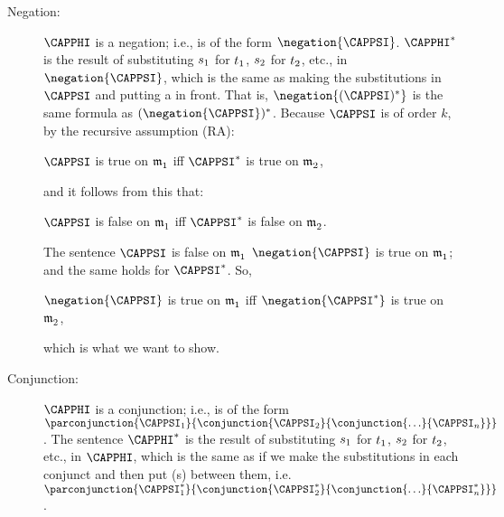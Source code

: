 \begin{PROOF}
\begin{description}
\begin{description}
\item[Negation:] $\CAPPHI$ is a negation; i.e., is of the form $\negation{\CAPPSI}$. 
 $\CAPPHI^*$ is the result of substituting $s_1$ for $t_1$, $s_2$ for $t_2$, etc., in $\negation{\CAPPSI}$, which is the same as making the substitutions in $\CAPPSI$ and putting a \mention{$\NEGATION$} in front. 
That is, $\negation{(\CAPPSI)^*}$ is the same formula as $(\negation{\CAPPSI})^*$. 
Because $\CAPPSI$ is of order $k$, by the recursive assumption (RA):
\begin{center}
$\CAPPSI$ is true on $\mathfrak{m^{\mathrm{}}_{\mathrm{1}}}$ iff $\CAPPSI^*$ is true on $\mathfrak{m^{\mathrm{}}_{\mathrm{2}}}$,
\end{center}
and it follows from this that:
\begin{center}
$\CAPPSI$ is false on $\mathfrak{m^{\mathrm{}}_{\mathrm{1}}}$ iff $\CAPPSI^*$ is false on $\mathfrak{m^{\mathrm{}}_{\mathrm{2}}}$.
\end{center}
The sentence $\CAPPSI$ is false on $\mathfrak{m^{\mathrm{}}_{\mathrm{1}}}$ \Iff $\negation{\CAPPSI}$ is true on $\mathfrak{m^{\mathrm{}}_{\mathrm{1}}}$; and the same holds for $\CAPPSI^*$.  So,
\begin{center}
$\negation{\CAPPSI}$ is true on $\mathfrak{m^{\mathrm{}}_{\mathrm{1}}}$ iff $\negation{\CAPPSI^*}$ is true on $\mathfrak{m^{\mathrm{}}_{\mathrm{2}}}$,
\end{center}
which is what we want to show.

\item[Conjunction:] $\CAPPHI$ is a conjunction; i.e., is of the form $\parconjunction{\CAPPSI_1}{\conjunction{\CAPPSI_2}{\conjunction{\ldots}{\CAPPSI_{\integer{n}}}}}$. 
The sentence $\CAPPHI^*$ is the result of substituting $s_1$ for $t_1$, $s_2$ for $t_2$, etc., in $\CAPPHI$, which is the same as if we make the substitutions in each conjunct and then put \mention{$\WEDGE$}(s) between them, i.e. $\parconjunction{\CAPPSI_1^*}{\conjunction{\CAPPSI_2^*}{\conjunction{\ldots}{\CAPPSI_{\integer{n}}^*}}}$. 


\end{description}
\end{description}
\end{PROOF}
